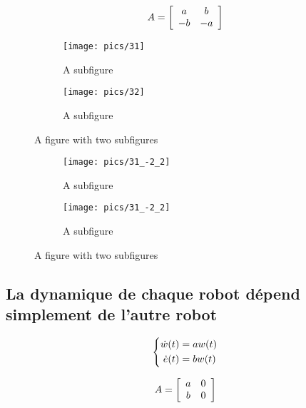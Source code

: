 \documentclass[utf8]{article}
\begin{document}
\begin{equation}
\centering
A = \left[
\begin{array}{cc}
a & b\\
-b & -a
\end{array}
\right]
 \end{equation}

\begin{figure}
\centering
\begin{subfigure}{.5\textwidth}
  \centering
  \texttt{[image: pics/31]}
  \caption{A subfigure}
\end{subfigure}%
\begin{subfigure}{.5\textwidth}
  \centering
  \texttt{[image: pics/32]}
  \caption{A subfigure}
\end{subfigure}
\caption{A figure with two subfigures}
\end{figure}

\begin{figure}
\centering
  \begin{subfigure}{.5\textwidth}
  \centering
  \texttt{[image: pics/31\_-2\_2]}
  \caption{A subfigure}
\end{subfigure}%
\begin{subfigure}{.5\textwidth}
  \centering
  \texttt{[image: pics/31\_-2\_2]}
  \caption{A subfigure}
\end{subfigure}
\caption{A figure with two subfigures}
\end{figure}

\newpage

\subsection{La dynamique de chaque robot dépend simplement de l’autre
robot}

\begin{equation}
\centering
\left\{\begin{split}
\dot{w}(t) &= aw(t) \\
\dot{e}(t) &= bw(t) \\
\end{split}\right.
 \end{equation}

\begin{equation}
\centering
A = \left[
\begin{array}{cc}
a & 0\\
b & 0
\end{array}
\right]
 \end{equation}
\end{document}
